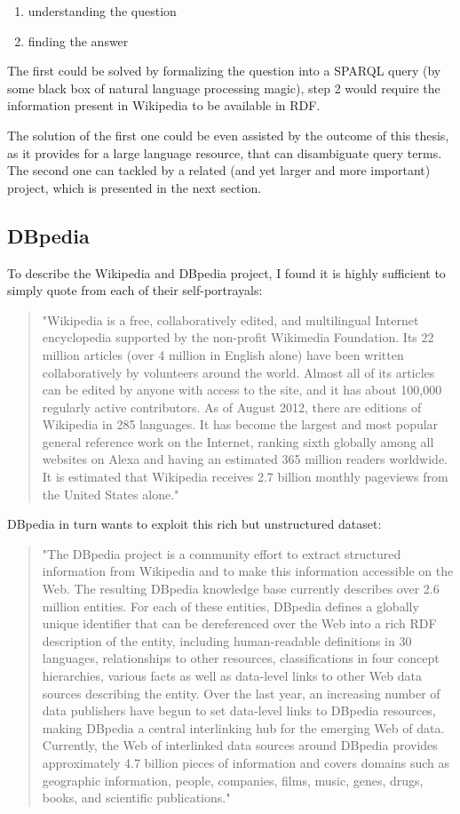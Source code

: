 \begin{enumerate}
\item understanding the question
\item finding the answer
\end{enumerate}

The first could be solved by formalizing the question into a SPARQL query (by some black box of natural language processing magic), step 2 would require the information present in Wikipedia to be available in RDF.

The solution of the first one could be even assisted by the outcome of this thesis, as it provides for a large language resource, that can disambiguate query terms. The second one can tackled by a related (and yet larger and more important) project, which is presented in the next section.

\subsection{DBpedia}
To describe the Wikipedia and DBpedia project, I found it is highly sufficient to simply quote from each of their self-portrayals:
\begin{quote}
"Wikipedia is a free, collaboratively edited, and multilingual Internet encyclopedia supported by the non-profit Wikimedia Foundation. Its 22 million articles (over 4 million in English alone) have been written collaboratively by volunteers around the world. Almost all of its articles can be edited by anyone with access to the site, and it has about 100,000 regularly active contributors. As of August 2012, there are editions of Wikipedia in 285 languages. It has become the largest and most popular general reference work on the Internet, ranking sixth globally among all websites on Alexa and having an estimated 365 million readers worldwide. It is estimated that Wikipedia receives 2.7 billion monthly pageviews from the United States alone."
\end{quote}
DBpedia in turn wants to exploit this rich but unstructured dataset:
\begin{quote}
"The DBpedia project is a community effort to extract structured information
from Wikipedia and to make this information accessible on the Web. The resulting
DBpedia knowledge base currently describes over 2.6 million entities. For each of
these entities, DBpedia defines a globally unique identifier that can be dereferenced
over the Web into a rich RDF description of the entity, including human-readable
definitions in 30 languages, relationships to other resources, classifications in four
concept hierarchies, various facts as well as data-level links to other Web data
sources describing the entity. Over the last year, an increasing number of data
publishers have begun to set data-level links to DBpedia resources, making DBpedia
a central interlinking hub for the emerging Web of data. Currently, the Web of
interlinked data sources around DBpedia provides approximately 4.7 billion pieces of
information and covers domains such as geographic information, people, companies,
films, music, genes, drugs, books, and scientific publications." \cite{dbpedia_jws_09}
\end{quote}


